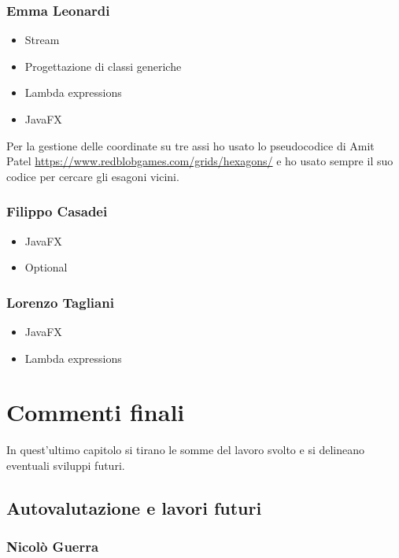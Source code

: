 \documentclass[a4paper,12pt]{report}
\begin{document}
\subsection{Emma Leonardi}
\begin{itemize}
	\item Stream
	\item Progettazione di classi generiche
	\item Lambda expressions
	\item JavaFX
\end{itemize}

Per la gestione delle coordinate su tre assi ho usato lo pseudocodice di Amit Patel \url{https://www.redblobgames.com/grids/hexagons/} e ho usato sempre il suo codice per cercare gli esagoni vicini.

\subsection{Filippo Casadei}
\begin{itemize}
	\item JavaFX
	\item Optional
\end{itemize}

\subsection{Lorenzo Tagliani}
\begin{itemize}
	\item JavaFX
	\item Lambda expressions
\end{itemize}

\chapter{Commenti finali}

In quest'ultimo capitolo si tirano le somme del lavoro svolto e si delineano eventuali sviluppi
futuri.

\section{Autovalutazione e lavori futuri}

\subsection{Nicolò Guerra}
\end{document}
